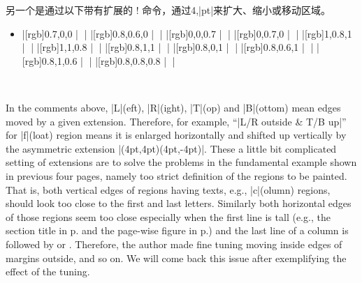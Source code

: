 另一个是通过以下带有扩展的 \!\backgroundcolor! 命令，通过4,|pt|来扩大、缩小或移动区域。
\begin{itemize}\item[]
|[rgb]{0.7,0,0}   |
    |%
|[rgb]{0.8,0.6,0} |
    |%
|[rgb]{0,0,0.7}   |
    |%
|[rgb]{0,0.7,0}   |
    |%
|[rgb]{1,0.8,1}          |
    |%
|[rgb]{1,1,0.8}          |
    |%
|[rgb]{0.8,1,1}            |
    |%
|[rgb]{0.8,0,1}   |
    |%
|[rgb]{0.8,0.6,1} |
    |%
|[rgb]{0.8,1,0.6}           |
    |%
|[rgb]{0.8,0.8,0.8}        |
    |%
\end{itemize}

\SpecialUsageIndex{\backgroundcolor}

In the comments above, |L|(eft), |R|(ight), |T|(op) and |B|(ottom) mean
edges moved by a given extension.  Therefore, for example,
``|L/R outside & T/B up|'' for |f|(loat) region means it is enlarged
horizontally and shifted up vertically by the asymmetric extension
|(4pt,4pt)(4pt,-4pt)|.  These a little bit complicated setting of
extensions are to solve the problems in the fundamental example shown in
previous four pages, namely too strict definition of the regions to be
painted.  That is, both vertical edges of regions having texts, e.g.,
|c|(olumn) regions, should look too close to the first and last letters.
Similarly both horizontal edges of those regions seem too close especially
when the first line is tall (e.g., the section title in
p.\Tie\pageref{sec:bgpaint} and the page-wise figure in
p.\Tie\pageref{page:bgpaint2}) and the last line of a column is followed by
\mctext{} or \postenv.  Therefore, the author made fine tuning moving
inside edges of margins outside, and so on.  We will come back this issue
after exemplifying the effect of the tuning.

